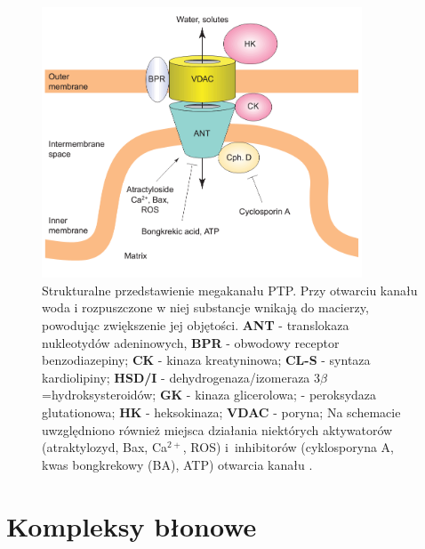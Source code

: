 \begin{figure}[tb]
\centering
\includegraphics[width=0.85\textwidth]{rysunki/rozdzial_1/ptp.png}
\caption[Megakanał PTP]{Strukturalne przedstawienie megakanału PTP. Przy otwarciu kanału woda i rozpuszczone w niej substancje wnikają do macierzy, powodując zwiększenie jej objętości. \textbf{ANT} - translokaza nukleotydów adeninowych, \textbf{BPR} - obwodowy receptor benzodiazepiny; \textbf{CK} - kinaza kreatyninowa; \textbf{CL-S} - syntaza kardiolipiny; \textbf{HSD/I} - dehydrogenaza/izomeraza 3$\beta$=hydroksysteroidów; \textbf{GK} - kinaza glicerolowa; - peroksydaza glutationowa; \textbf{HK} - heksokinaza; \textbf{VDAC} - poryna; Na schemacie uwzględniono również miejsca działania niektórych aktywatorów (atraktylozyd, Bax, Ca$^{2+}$, ROS) i~inhibitorów (cyklosporyna A, kwas bongkrekowy (BA), ATP) otwarcia kanału \cite{Leo2005}.}
\label{fig:PTP}
\end{figure}

\section{Kompleksy błonowe}\label{s:kompleksy_blonowe}


